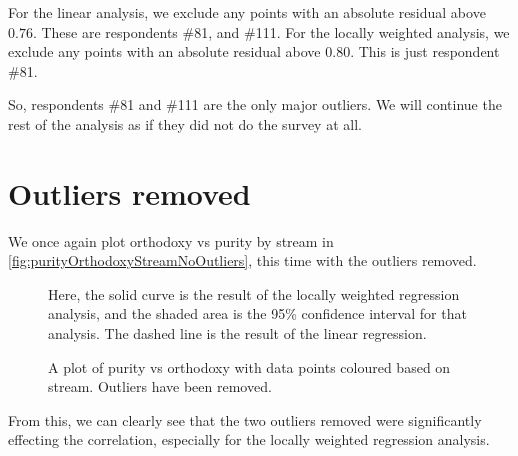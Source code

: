 For the linear analysis, we exclude any points with an absolute residual above $0.76$.
These are respondents \#81, and \#111.
For the locally weighted analysis, we exclude any points with an absolute residual above $0.80$.
This is just respondent \#81.

So, respondents \#81 and \#111 are the only major outliers.
We will continue the rest of the analysis as if they did not do the survey at all.

\section{Outliers removed}
We once again plot orthodoxy vs purity by stream in \vref{fig:purityOrthodoxyStreamNoOutliers}, this time with the outliers removed.
\begin{figure}[H]
	\caption{A plot of purity vs orthodoxy with data points coloured based on stream. Outliers have been removed.}
	\label{fig:purityOrthodoxyStreamNoOutliers}
	Here, the solid curve is the result of the locally weighted regression analysis, and the shaded area is the 95\% confidence interval for that analysis.
	The dashed line is the result of the linear regression.
\end{figure}

From this, we can clearly see that the two outliers removed were significantly effecting the correlation, especially for the locally weighted regression analysis.
